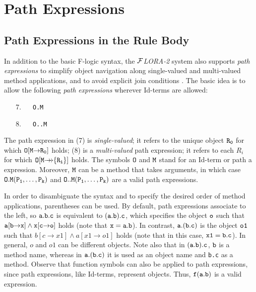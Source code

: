 \documentclass[11pt]{article}
\newcommand{\fd}{\ensuremath{{\rightarrow}}}                   %
\newcommand{\mvd}{\ensuremath{{\rightarrow\!\!\!\!\rightarrow}}}  %
\newcommand{\FLORA}{{\mbox{${\cal F}${\small\it LORA}\rm\emph{-2}}}\xspace}
\newcommand{\fl}{\mbox{F-logic}\xspace}
\begin{document}
\section{Path Expressions}\label{sec-pathexpr}

\subsection{Path Expressions in the Rule Body}


 
In addition to the basic \fl syntax, the \FLORA  system also supports
\emph{path expressions} to simplify object navigation along
single-valued and multi-valued method applications, and to avoid
explicit join conditions \cite{frohn-lausen-uphoff-VLDB-94}.  The
basic idea is to allow the following \emph{path expressions} wherever
Id-terms are allowed:

  \medskip

\begin{enumerate} 
\item[7.]\label{eq-path-fun} ~~ {\tt O.M}
\item[8.]\label{eq-path-set} ~~ {\tt O..M} 
\end{enumerate} \medskip

\noindent
The path expression in (7) is \emph{single-valued}; it refers to the unique
object $\tt R_0$ for which $\tt O[M\fd R_0]$ holds; (8) is a
\emph{multi-valued} path expression; it refers to each $R_i$ for which $\tt
O[M\mvd\{R_i\}]$ holds.  The symbols $\tt O$ and $\tt M$ stand for an
Id-term or path a expression.  Moreover, $\tt M$ can be a method that takes
arguments, in which case $\tt O.M(P_1,\dots,P_k)$ and $\tt
O..M(P_1,\dots,P_k)$ are a valid path expressions.
  
In order to disambiguate the syntax and to specify the desired order of
method applications, parentheses can be used. By default, path expressions
associate to the left, so $\tt a.b.c$ is equivalent to $\tt (a.b).c$, which
specifies the object $\tt o$ such that $\tt a[b\fd x] \land x[c\fd o]$
holds (note that $\tt x=a.b$). In contrast, $\tt a.(b.c)$ is the object
$\tt o1$ such that $b[c\fd x1] \land a[x1\fd o1]$ holds (note that in this
case, $\tt x1=b.c$). In general, $o$ and $o1$ can be different objects.
Note also that in $\tt (a.b).c$, $\tt b$ is a method name, whereas in $\tt
a.(b.c)$ it is used as an object name and {\tt b.c} as a method.  Observe
that function symbols can also be applied to path expressions, since path
expressions, like Id-terms, represent objects. Thus, $\tt f(a.b)$
is a valid expression.
\end{document}
